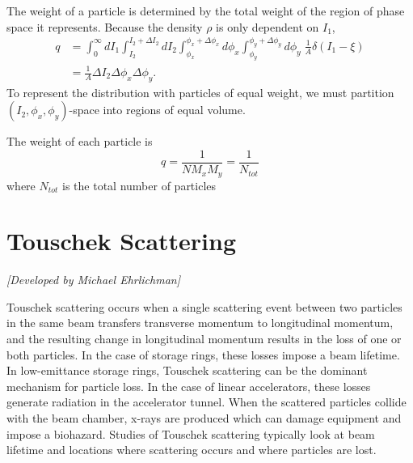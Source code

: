 The weight of a particle is determined by the total weight of the region 
of phase space it represents.  
Because the density $\rho$ is only dependent on $I_1$,
\begin{align}
   q &= \int_{0}^{\infty} dI_1 \int_{I_2}^{I_2 + \Delta I_2} 
     dI_2 \int_{\phi_x}^{\phi_x + \Delta \phi_x} d\phi_x 
    \int_{\phi_y}^{\phi_y + \Delta \phi_y} d\phi_y \; \frac{1}{A} \delta(I_1 - \xi) \\
   &= \frac{1}{A} \Delta I_2 \Delta \phi_x \Delta \phi_y.
\end{align}
To represent the distribution with particles of equal weight, 
we must partition $(I_2,\phi_x,\phi_y)$-space into regions of equal volume.

The weight of each particle is
\begin{equation}
  q = \frac{1}{N M_x M_y} = \frac{1}{N_{tot}}
\end{equation}
where $N_{tot}$ is the total number of particles

\section{Touschek Scattering}
\label{s:touschek}

\textit{[Developed by Michael Ehrlichman]}

Touschek scattering occurs when a single scattering event between two particles in the same beam
transfers transverse momentum to longitudinal momentum, and the resulting change in longitudinal
momentum results in the loss of one or both particles.  In the case of storage rings, these losses
impose a beam lifetime.  In low-emittance storage rings, Touschek scattering can be the dominant
mechanism for particle loss.  In the case of linear accelerators, these losses generate radiation in
the accelerator tunnel.  When the scattered particles collide with the beam chamber, x-rays are
produced which can damage equipment and impose a biohazard.  Studies of Touschek scattering
typically look at beam lifetime and locations where scattering occurs and where particles are lost.

